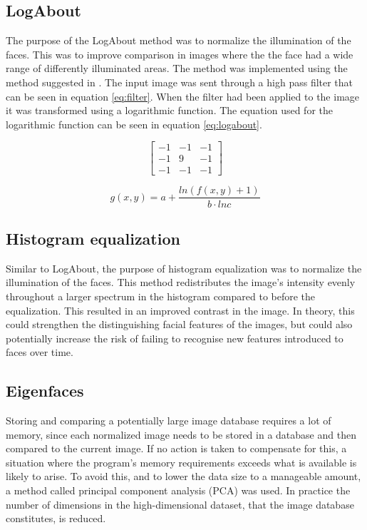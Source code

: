 \subsection{LogAbout}
The purpose of the LogAbout method was to normalize the illumination of the faces. This was to improve comparison in images where the the face had a wide range of differently illuminated areas. The method was implemented using the method suggested in \cite{logabout}. The input image was sent through a high pass filter that can be seen in equation \ref{eq:filter}. When the filter had been applied to the image it was transformed using a logarithmic function. The equation used for the logarithmic function can be seen in equation \ref{eq:logabout}.

\begin{equation}
  \begin{bmatrix}
    -1 & -1 & -1\\
    -1 & 9 & -1\\
    -1 & -1 & -1
  \end{bmatrix}
  \label{eq:filter}
\end{equation}

\begin{equation}
  g(x,y) = a + \frac{ln(f(x,y) + 1)}{b\cdot ln c}
  \label{eq:logabout}
\end{equation}

\subsection{Histogram equalization}
Similar to LogAbout, the purpose of histogram equalization was to normalize
the illumination of the faces. This method redistributes the image’s intensity
evenly throughout a larger spectrum in the histogram compared to before the
equalization. This resulted in an improved contrast in the image. \cite{histeq}
In theory, this could strengthen the distinguishing facial features of the images, but could also potentially increase the risk of failing to recognise
new features introduced to faces over time.

\subsection{Eigenfaces}
Storing and comparing a potentially large image database requires a lot of
memory, since each normalized image needs to be stored in a database and then
compared to the current image. If no action is taken to compensate for this, a
situation where the program’s memory requirements exceeds what is available is
likely to arise. To avoid this, and to lower the data size to a manageable
amount, a method called principal component analysis (PCA) was used. In
practice the number of dimensions in the high-dimensional dataset, that the
image database constitutes, is reduced.

